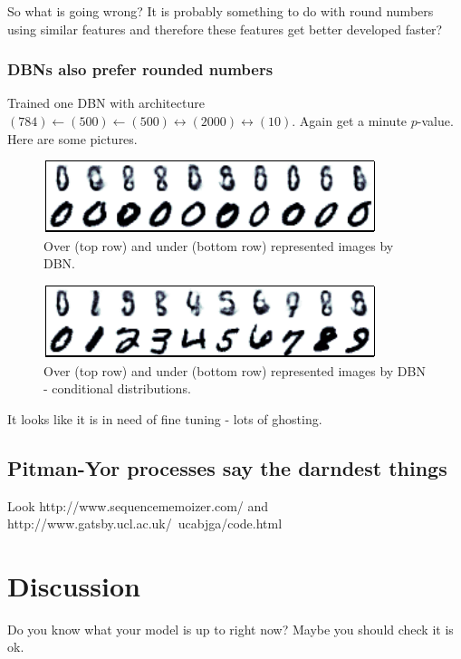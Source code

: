 \documentclass{article}
\begin{document}
So what is going wrong?
It is probably something to do with round numbers using similar features and therefore these features get better developed faster?

\subsubsection{DBNs also prefer rounded numbers}


Trained one DBN with architecture $(784)\leftarrow(500)\leftarrow(500)\leftrightarrow(2000)\leftrightarrow(10)$.
Again get a minute $p$-value.
Here are some pictures.

\begin{figure}[ht]
\centering
\includegraphics[width=0.98\columnwidth]{figures/dbn_over_under}
\caption{
Over (top row) and under (bottom row) represented images by DBN.
}
\label{fig:many_rbm_over_under}
\end{figure}

\begin{figure}[ht]
\centering
\includegraphics[width=0.98\columnwidth]{figures/dbn_over_under_digit}
\caption{
Over (top row) and under (bottom row) represented images by DBN - conditional distributions.
}
\label{fig:many_rbm_over_under_digit}
\end{figure}

It looks like it is in need of fine tuning - lots of ghosting.

\subsection{Pitman-Yor processes say the darndest things}

Look http://www.sequencememoizer.com/ and http://www.gatsby.ucl.ac.uk/~ucabjga/code.html

\section{Discussion}

Do you know what your model is up to right now?
Maybe you should check it is ok.



\end{document}
